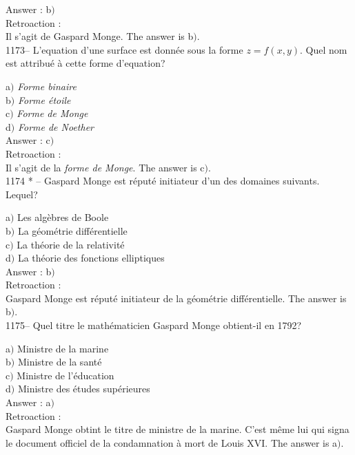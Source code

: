 ﻿\documentclass[letterpaper, 12pt]{article}
\begin{document}
Answer : b$)$\\

Retroaction : \\
Il s'agit de Gaspard Monge.
The answer is b$)$.\\

1173-- L'equation d'une surface est donn\'ee sous la forme
$z=f(x,y)$. Quel nom est attribu\'e \`a cette forme d'equation?

a$)$ {\sl Forme binaire} \\
b$)$ {\sl Forme \'etoile} \\
c$)$ {\sl Forme de Monge} \\
d$)$ {\sl Forme de Noether}\\

Answer : c$)$\\

Retroaction : \\
Il s'agit de la {\sl forme de Monge}.
The answer is c$)$.\\

1174 * -- Gaspard Monge est r\'eput\'e initiateur d'un des domaines
suivants. Lequel?

a$)$ Les alg\`ebres de Boole \\
b$)$ La g\'eom\'etrie diff\'erentielle \\
c$)$ La th\'eorie de la relativit\'e \\
d$)$ La th\'eorie des fonctions elliptiques\\

Answer : b$)$\\

Retroaction : \\
Gaspard Monge est r\'eput\'e initiateur de la g\'eom\'etrie
diff\'erentielle.
The answer is b$)$.\\

1175-- Quel titre le math\'ematicien Gaspard Monge obtient-il en
1792?

a$)$ Ministre de la marine \\
b$)$ Ministre de la sant\'e \\
c$)$ Ministre de l'\'education  \\
d$)$ Ministre des \'etudes sup\'erieures\\

Answer : a$)$\\

Retroaction : \\
Gaspard Monge obtint le titre de ministre de la marine. C'est m\^eme
lui qui signa le document officiel de la condamnation \`a mort de
Louis XVI.
The answer is a$)$.\\
\end{document}

